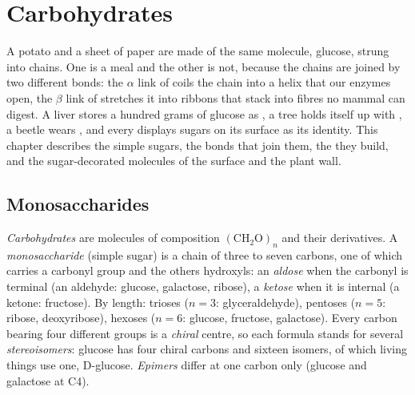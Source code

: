 \chapter{Carbohydrates}\label{ch:b1:carbohydrates}

A potato and a sheet of paper are made of the same molecule, glucose,
strung into chains. One is a meal and the other is not, because the
chains are joined by two different bonds: the $\alpha$ link of 
coils the chain into a helix that our enzymes open, the $\beta$ link of
 stretches it into ribbons that stack into fibres no mammal
can digest. A liver stores a hundred grams of glucose as , a
tree holds itself up with , a beetle wears , and every
 displays sugars on its surface as its identity. This chapter
describes the simple sugars, the bonds that join them, the
 they build, and the sugar-decorated molecules of the
 surface and the plant wall.

\section{Monosaccharides}

\begin{definition}[Monosaccharide]\label{def:b1:carbohydrates:monosaccharide}
\emph{Carbohydrates} are molecules of composition
$(\mathrm{CH_2O})_n$ and their derivatives. A
\emph{monosaccharide} (simple sugar) is a chain
of three to seven carbons, one of which carries a carbonyl group and
the others hydroxyls: an \emph{aldose} when the carbonyl
is terminal (an aldehyde: glucose, galactose, ribose), a
\emph{ketose} when it is internal (a ketone: fructose).
By length: trioses ($n = 3$: glyceraldehyde), pentoses ($n = 5$:
ribose, deoxyribose), hexoses ($n = 6$: glucose, fructose, galactose).
Every carbon bearing four different groups is a \emph{chiral} centre,
so each formula stands for several \emph{stereoisomers}: glucose has
four chiral carbons and sixteen isomers, of which living things use one,
D-glucose. \emph{Epimers} differ at one carbon only (glucose and
galactose at C4).
\end{definition}


